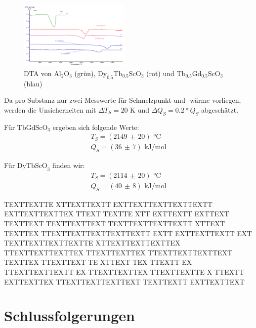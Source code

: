 \documentclass[aps,twocolumn,secnumarabic,nobalancelastpage,amsmath,amssymb,
nofootinbib,superscriptaddress]{revtex4-1}
\begin{document}
\begin{figure}[h]
  \centering
  \includegraphics[width=0.48\textwidth]{../img/Messkurven_unsere.png}
  \caption{\label{fig:dtaDyTb+TbGd} DTA von $\text{Al}_{2}\text{O}_3$ (grün), $\text{Dy}_{0.5}\text{Tb}_{0.5}\text{ScO}_3$ (rot)
  und $\text{Tb}_{0.5}\text{Gd}_{0.5}\text{ScO}_3$ (blau)}
\end{figure}

\noindent Da pro Substanz nur zwei Messwerte für Schmelzpunkt und -wärme vorliegen, werden die Unsicherheiten mit $\Delta T_S=20\text{ K}$ und $\Delta Q_S=0.2*Q_S$ abgeschätzt.

Für $\text{TbGdScO}_3$ ergeben sich folgende Werte:
\begin{eqnarray}
  T_S = (2149\,\pm\, 20)\text{ °C}\;\:\, \nonumber \\
  Q_S = (36\,\pm\, 7)\text{ kJ/mol} \nonumber
  \label{eq:XXX}
\end{eqnarray}

\noindent Für $\text{DyTbScO}_3$ finden wir:
\begin{eqnarray}
  T_S = (2114\,\pm\, 20)\text{ °C}\;\:\, \nonumber \\
  Q_S = (40\,\pm\, 8)\text{ kJ/mol} \nonumber
  \label{eq:XXX}
\end{eqnarray}

\newline TEXTTEXTTE XTTEXTTEXTT EXTTEXTTEXTTEXTTEXTT EXTTEXTTEXTTEX TTEXT TEXTTE XTT EXTTEXTT EXTTEXT TEXTTEXT TEXTTEXTTEXT TEXTTEXTTEXTTEXTT XTTEXT
TEXTTEX TTEXTTEXTTEXTTEXTTEXTT EXTT EXTTEXTTEXTT EXT TEXTTEXTTEXTTEXTTE XTTEXTTEXTTEXTTEX TTEXTTEXTTEXTTEX TTEXTTEXTTEX TTEXTTEXTTEXTTEXT
TEXTTEX TTEXTTEXT TE XTTEXT TEX TTEXTT EX TTEXTTEXTTEXTT EX TTEXTTEXTTEX TTEXTTEXTTE X TTEXTT EXTTEXTTEX TTEXTTEXTTEXTTEXT TEXTTEXTT EXTTEXTTEXT


\section{Schlussfolgerungen}
\end{document}

